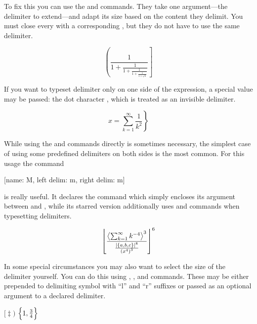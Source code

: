 To fix this you can use the  and  commands. They take one
argument---the delimiter to extend---and adapt its size based on the content
they delimit. You must close every  with a corresponding ,
but they do not have to use the same delimiter.
\begin{chktexignore}
\begin{example}
\[
  \left(
    \frac{1}{1 +
      \frac{1}{1 +
        \frac{1}{1 +
          \frac{1}{1 +
            \sqrt{2}}}}}
  \right]
\]
\end{example}
\end{chktexignore}
If you want to typeset delimiter only on one side of the expression, a special
value may be passed: the dot character , which is treated as an invisible
delimiter.
\begin{example}
\[
  x = \left.
    \sum_{k=1}^{\infty}
      \frac{1}{k^2}
  \right\}
\]
\end{example}

While using the  and  commands directly is sometimes
necessary, the simplest case of using some predefined delimiters on both sides
is the most common. For this usage the command
\begin{lscommand}
  [name: M, left delim: m, right delim: m]
\end{lscommand}
is really useful. It declares the  command which simply encloses its
argument between  and , while its starred
version additionally uses  and  commands when typesetting
delimiters.
\begin{chktexignore}
\begin{example}[vertical_mode, examplewidth=0.8\linewidth]
\DeclarePairedDelimiter{\set}{\{}{\}}
\DeclarePairedDelimiter{\size}{\lvert}{\rvert}
\DeclarePairedDelimiter{\mean}{\langle}{\rangle}
\DeclarePairedDelimiter{\floor}{\lfloor}{\rfloor}
\DeclarePairedDelimiter{\group}{(}{)}
\[
  \floor*{
    \frac
    {\mean*{\sum_{k=1}^{\infty} k^{-4}}^3}
    {\frac{\size*{\set{a,b,c}}^8}{\group*{x^4}^3}}
  }^6
\]
\end{example}
\end{chktexignore}

In some special circumstances you may also want to select the size of the
delimiter yourself. You can do this using  , ,  and
 commands. These may be either prepended to delimiting symbol with
\enquote{l} and \enquote{r} suffixes or passed as an optional argument to a
declared delimiter.
\begin{chktexignore}
  \begin{example}
\DeclarePairedDelimiter{%
  \set}{\{}{\}}
\( \bigl[ \ddagger \Biggr) \)
\quad %
\( \set[\Big]{1,\frac{3}{4}} \)
\end{example}
\end{chktexignore}

